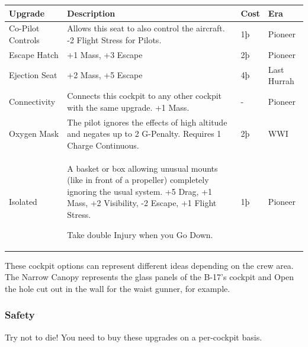 \documentclass{article}
\begin{document}
\begin{tabular}{|l|l|l|l|}
    \hline
    Upgrade                                          & Description                                                 & Cost    & Era         \\\hline
    Co-Pilot Controls                                & Allows this seat to also control the aircraft. -2
    Flight Stress for Pilots.                        & 1þ                                                          & Pioneer               \\\hline
    Escape Hatch                                     & +1 Mass, +3 Escape                                          & 2þ      & Pioneer     \\\hline
    Ejection Seat                                    & +2 Mass, +5 Escape                                          & 4þ      & Last Hurrah \\\hline
    Connectivity                                     & Connects this cockpit to any other cockpit with the same
    upgrade. +1 Mass.                                & -                                                           & Pioneer               \\\hline
    Oxygen Mask                                      & The pilot ignores the effects of high altitude and negates
    up to 2 G-Penalty. Requires 1 Charge Continuous. & 2þ                                                          & WWI                   \\\hline
    Isolated                                         & A basket or box allowing unusual mounts (like in front of a
    propeller) completely ignoring the usual system. +5 Drag, +1 Mass, +2
    Visibility, -2 Escape, +1 Flight Stress.

    Take double Injury when you Go Down.             & 1þ                                                          & Pioneer               \\\hline
\end{tabular}

These cockpit options can represent different ideas depending on
the crew area. The Narrow Canopy represents the glass panels of the
B-17's cockpit and Open the hole cut out in the wall for the waist
gunner, for example.

\subsubsection{Safety}
\label{_Safety}

Try not to die! You need to buy these upgrades on a per-cockpit basis.
\end{document}
